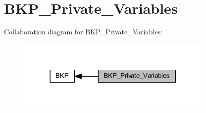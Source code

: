 \hypertarget{group___b_k_p___private___variables}{}\section{B\+K\+P\+\_\+\+Private\+\_\+\+Variables}
\label{group___b_k_p___private___variables}
Collaboration diagram for B\+K\+P\+\_\+\+Private\+\_\+\+Variables\+:
\nopagebreak
\begin{figure}[H]
\begin{center}
\leavevmode
\includegraphics[width=270pt]{group___b_k_p___private___variables}
\end{center}
\end{figure}

